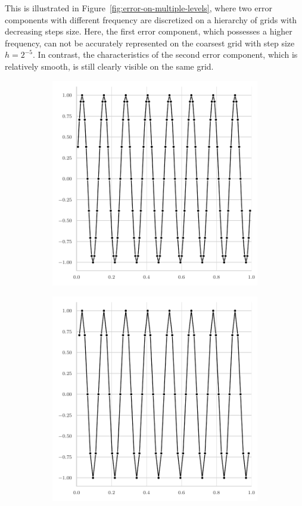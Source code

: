 This is illustrated in Figure~\ref{fig:error-on-multiple-levels}, where two error components with different frequency are discretized on a hierarchy of grids with decreasing steps size.
Here, the first error component, which possesses a higher frequency, can not be accurately represented on the coarsest grid with step size $h = 2^{-5}$.
In contrast, the characteristics of the second error component, which is relatively smooth, is still clearly visible on the same grid. 
\begin{figure}
	\begin{subfigure}[b]{0.32\textwidth}
		\centering
		\includegraphics[width=\textwidth]{figures/initial_error_16pi_level7.pdf}
	\end{subfigure}
	\hfill
	\begin{subfigure}[b]{0.32\textwidth}
		\centering
		\includegraphics[width=\textwidth]{figures/initial_error_16pi_level6.pdf}

\end{subfigure}
\end{figure}
